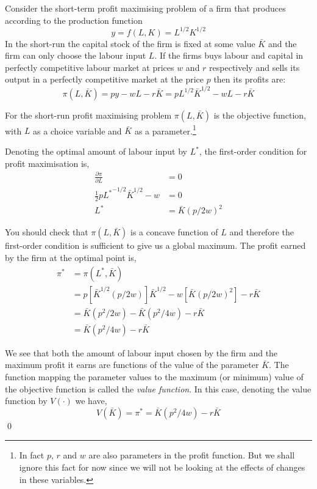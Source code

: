 \documentclass[11pt,reqno,openany]{amsbook}
\begin{document}
\begin{exmp}\label{exmp:opti:profit}
Consider the short-term profit
maximising problem of a firm that produces according
to the production function
\[y=f(L,K)=L^{1/2}K^{1/2}\]
In the short-run the capital stock of the firm is fixed at some value
$\bar K$ and the firm can only choose the labour input $L$. If the
firms buys labour and capital in perfectly competitive labour market at prices
$w$ and $r$ respectively and sells its output in a perfectly competitive market at the
price $p$ then its profits are:
\[\pi(L,\bar K)=py-wL-r\bar K=pL^{1/2}{\bar K}^{1/2}-wL-r\bar K\]

For the short-run profit maximising problem $\pi(L,\bar K)$ is the
objective function, with $L$ as a choice variable and $\bar K$ as a
parameter.\footnote{In fact $p$, $r$ and $w$ are also parameters in
  the profit function. But we shall ignore this fact for now since we
  will not be looking at the effects of changes in these variables.}

Denoting the optimal amount of labour input by $L^*$, the first-order condition for profit maximisation is,
\begin{align*}
\frac{\partial \pi}{\partial L}&=0\\
\frac{1}{2}p{L^*}^{-1/2}{\bar K}^{1/2}-w&=0\\
L^*&={\bar K}(p/2w)^2
\end{align*}

You should check that $\pi(L,\bar K)$ is a concave function of $L$ and
therefore the first-order condition is sufficient to give us a global
maximum. The profit earned by the firm at the optimal point is,
\begin{align*}
\pi^*&=\pi(L^*,\bar K)\\
&=p[{\bar K}^{1/2}(p/2w)]{\bar K}^{1/2}-w[{\bar K}(p/2w)^2]-r\bar K\\
&={\bar K}(p^2/2w)-{\bar K}(p^2/4w)-r\bar K\\
&={\bar K}(p^2/4w)-r\bar K
\end{align*}

We see that both the amount of labour input chosen by the firm and the
maximum profit it earns are functions of the value of the parameter
$\bar K$. The function mapping the parameter values to the maximum (or
minimum) value of the objective function is called the \emph{value
  function}. In this case, denoting the value function by $V(\cdot)$
we have,
\[V(\bar K)=\pi^*={\bar K}(p^2/4w)-r\bar K\]
\qed
\end{exmp}
\end{document}
